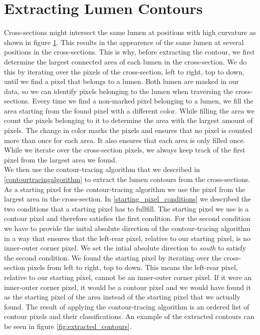 \documentclass[thesis.tex]{subfiles}
\begin{document}
\section{Extracting Lumen Contours}
Cross-sections might intersect the same lumen at positions with high curvature as shown in figure \ref{}. This results in the appearence of the same lumen at several positions in the cross-sections. This is why, before extracting the contour, we first determine the largest connected area of each lumen in the cross-section. We do this by iterating over the pixels of the cross-section, left to right, top to down, until we find a pixel that belongs to a lumen. Both lumen are masked in our data, so we can identify pixels belonging to the lumen when traversing the cross-sections. Every time we find a non-marked pixel belonging to a lumen, we fill the area starting from the found pixel with a different color. While filling the area we count the pixels belonging to it to determine the area with the largest amount of pixels. The change in color marks the pixels and ensures that no pixel is counted more than once for each area. It also ensures that each area is only filled once. While we iterate over the cross-section pixels, we always keep track of the first pixel from the largest area we found.\\   

We then use the contour-tracing algorithm that we described in \ref{contourtracingalgorithm} to extract the lumen contours from the cross-sections. As a starting pixel for the contour-tracing algorithm we use the pixel from the largest area in the cross-section. In \ref{starting_pixel_conditions} we described the two conditions that a starting pixel has to fullfill. The starting pixel we use is a contour pixel and therefore satisfies the first condition. For the second condition we have to provide the inital absolute direction of the contour-tracing algorithm in a way that ensures that the left-rear pixel, relative to our starting pixel, is no inner-outer corner pixel. We set the intial absolute direction to \textit{south} to satisfy the second condition. We found the starting pixel by iterating over the cross-section pixels from left to right, top to down. This means the left-rear pixel, relative to our starting pixel, cannot be an inner-outer corner pixel. If it were an inner-outer corner pixel, it would be a contour pixel and we would have found it as the starting pixel of the area instead of the starting pixel that we actually found. The result of applying the contour-tracing algorithm is an ordered list of contour pixels and their classifications.
An example of the extracted contours can be seen in figure \ref{fig:extracted_contours}.
\end{document}
